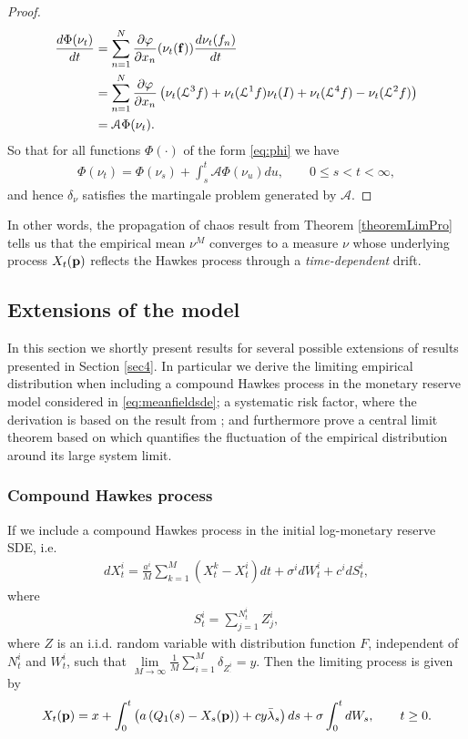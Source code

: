 \documentclass[10pt]{article}
\theoremstyle{plain}
\theoremstyle{definition}
\newcommand{\<}{\langle}
\renewcommand{\>}{\rangle}
\renewcommand{\(}{\left(}
\renewcommand{\)}{\right)}
\renewcommand{\[}{\left[}
\renewcommand{\]}{\right]}
\def \phi {{\varphi}}
\begin{document}
\begin{proof}
\begin{align}
\frac{d\Phi(\nu_t)}{dt}&=\sum\limits_{n=1}^N\frac{\partial\phi}{\partial
x_n}(\nu_t(\bold{f}))\frac{d\nu_t(f_n)}{dt}\\ &=\sum\limits_{n=1}^N\frac{\partial\phi}{\partial
x_n}\left(\nu_t(\mathcal{L}^3f)+\nu_t(\mathcal{L}^1f)\nu_t(I)+\nu_t(\mathcal{L}^4f)-\nu_t(\mathcal{L}^2f)\right)\\
&=\mathcal{A}\Phi(\nu_t).
\end{align}
So that for all functions $\Phi(\cdot)$ of the form \eqref{eq:phi} we have
\begin{align}
\Phi(\nu_t)=\Phi(\nu_s)+\int_s^t\mathcal{A}\Phi(\nu_u)du,\qquad 0\leq s<t<\infty,
\end{align}
and hence $\delta_\nu$ satisfies the martingale problem generated by $\mathcal{A}$.
\end{proof}
In other words, the propagation of chaos result from Theorem \ref{theoremLimPro} tells us that the empirical mean $\nu^M$ converges to a measure $\nu$ whose underlying process $X_t(\bold{p})$ reflects the Hawkes process through a \emph{time-dependent} drift.

\subsection{Extensions of the model}
In this section we shortly present results for several possible extensions of results presented in Section \ref{sec4}. In particular we derive the limiting empirical distribution when including a compound Hawkes process in the monetary reserve model considered in \eqref{eq:meanfieldsde}; a systematic risk factor, where the derivation is based on the result from \citet{giesecke15}; and furthermore prove a central limit theorem based on \citet{spiliopoulos14} which quantifies the fluctuation of the empirical distribution around its large system limit. 

\subsubsection{Compound Hawkes process}
If we include a compound Hawkes process in the initial log-monetary reserve SDE, i.e.
\begin{align}
dX_t^i = \frac{a^i}{M}\sum\limits_{k=1}^M(X_t^k-X_t^i)dt + \sigma^idW_t^i + c^idS_t^i,
\end{align}
where
\begin{align}
S_t^i = \sum\limits_{j=1}^{N_t^i}Z_j^i,
\end{align}
where $Z$ is an i.i.d. random variable with distribution function $F$, independent of $N_t^i$ and
$W_t^i$, such that $\lim\limits_{M\rightarrow\infty}\frac{1}{M} \sum\limits_{i=1}^M
\delta_{Z_\cdot^i} = y$. Then the limiting process is given by
\begin{align}
 X_t(\bold{p})=x+\int_0^t\left(a\left(Q_1(s)-X_s(\bold{p})\right)+cy\bar\lambda_s\right)ds+\sigma \int_0^tdW_s, \qquad t\geq 0.
\end{align}
\end{document}
